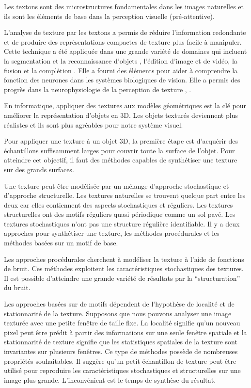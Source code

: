 \begin{definition}
Les textons sont des microstructures fondamentales dans les images naturelles et ils 
sont les éléments de base dans la perception visuelle (pré-attentive).
\end{definition}

L'analyse de texture par les textons a permis de réduire 
l'information redondante et de produire des  représentations compactes de texture plus facile à manipuler.
Cette technique a été appliquée dans une grande variété de domaines qui incluent la segmentation et 
la reconnaissance d'objets \cite{leung2001representing}, l'édition d'image et de vidéo, la fusion et la complétion \cite{wexler2004space}.
Elle a fourni des éléments pour aider à comprendre la fonction 
des neurones dans les systèmes biologiques de vision. 
Elle a permis des progrès dans la neurophysiologie de la perception de texture \cite{olshausen1997sparse}, \cite{landy2004visual}.

En informatique, appliquer des textures aux modèles géométriques est la clé pour améliorer la représentation d'objets en 3D. 
Les objets texturés deviennent plus réalistes et ils sont plus agréables pour notre système visuel.

Pour appliquer une texture à un objet 3D, la première étape est d'acquérir des échantillons suffisamment 
larges pour couvrir toute la surface de l'objet.
Pour atteindre cet objectif, il faut des méthodes capables de synthétiser une texture sur des grands surfaces.

Une texture peut être modélisée par un mélange d'approche stochastique et d'approche structurelle.
Les textures naturelles se trouvent quelque part entre les deux car elles contiennent des aspects stochastiques et réguliers.
Les textures structurelles ont des motifs réguliers quasi périodique comme un sol pavé.
Les textures stochastiques n'ont pas une structure régulière identifiable.
Il y a deux approches pour synthétiser une texture, les méthodes procédurales et les méthodes basées sur un motif de base.

Les approches procédurales cherchent à modéliser la texture à l'aide de fonctions de bruit.
Ces méthodes exploitent les caractéristiques stochastiques des textures.
Il est possible d'atteindre une grande variété de résultats par la ``structuration'' du bruit.

Les approches basées sur de motifs dépendent de l'hypothèse de localité et de stationnarité de la texture.
Supposons que nous pouvons analyser une image texturée avec une petite fenêtre de taille fixe.
La localité signifie qu'un nouveau pixel peut être prédit à partir des informations sur une seule fenêtre spatiale 
et la stationnarité de texture signifie que les statistiques spatiales de la texture sont invariantes sur plusieurs fenêtres.
Ce type de méthodes possède de nombreuses propriétés souhaitables.
Il suggère qu'un petit échantillon de texture peut être utilisé pour reproduire 
les caractéristiques stochastiques et structurelles sur une image plus grande.
L'inconvénient est le temps de synthèse du résultat.


